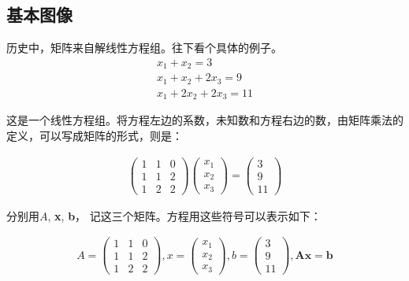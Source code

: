 \subsection{基本图像}
历史中，矩阵来自解线性方程组。往下看个具体的例子。
\begin{gather*}
	x_1+x_2=3\\
	x_1+x_2+2x_3=9\\
	x_1+2x_2+2x_3=11
\end{gather*}

这是一个线性方程组。将方程左边的系数，未知数和方程右边的数，由矩阵乘法的定义，可以写成矩阵的形式，则是：

\begin{gather*}
	\begin{pmatrix} 1&1&0\\1&1&2\\1&2&2 \end{pmatrix} \begin{pmatrix} x_1\\x_2\\x_3 \end{pmatrix}=
	\begin{pmatrix}	3\\9\\11 \end{pmatrix}
\end{gather*}

分别用$ A $, \textbf{x}, \textbf{b}， 记这三个矩阵。方程用这些符号可以表示如下：

\begin{gather*}
A = \begin{pmatrix} 1&1&0\\1&1&2\\1&2&2 \end{pmatrix}, x = \begin{pmatrix} x_1\\x_2\\x_3 \end{pmatrix},b = 	\begin{pmatrix}	3\\9\\11 \end{pmatrix}, \mathbf{ Ax = b }
\end{gather*}

